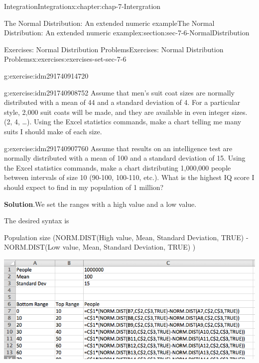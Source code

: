 \documentclass[oneside,10pt,]{book}
\numberwithin{equation}{section}
\begin{document}
\begin{chapterptx}{Integration}{}{Integration}{}{}{x:chapter:chap-7-Intergration}
\begin{sectionptx}{The Normal Distribution: An extended numeric example}{}{The Normal Distribution: An extended numeric example}{}{}{x:section:sec-7-6-NormalDistribution}
\begin{exercises-subsection}{Exercises: Normal Distribution Problems}{}{Exercises: Normal Distribution Problems}{}{}{x:exercises:exercises-set-sec-7-6}
\begin{divisionexercise}{7}{}{}{g:exercise:idm291740914720}
\end{divisionexercise}%
\begin{divisionexercise}{8}{}{}{g:exercise:idm291740908752}%
Assume that men’s suit coat sizes are normally distributed with a mean of 44 and a standard deviation of 4.  For a particular style, 2,000 suit coats will be made, and they are available in even integer sizes.  (2, 4, …). Using the Excel statistics commands, make a chart telling me many suits I should make of each size.%
\end{divisionexercise}%
\begin{divisionexercise}{9}{}{}{g:exercise:idm291740907760}%
Assume that results on an intelligence test are normally distributed with a mean of 100 and a standard deviation of 15.  Using the Excel statistics commands, make a chart distributing 1,000,000 people between intervals of size 10 (90-100, 100-110, etc.).  What is the highest IQ score I should expect to find in my population of 1 million?%
\par\smallskip%
\noindent\textbf{Solution}.\hypertarget{g:solution:idm291740906896}{}\quad{}We set the ranges with a high value and a low value.%
\par
The desired syntax is%
\par
Population size \textasteriskcentered{} (NORM.DIST(High value, Mean, Standard Deviation, TRUE) - NORM.DIST(Low value, Mean, Standard Deviation, TRUE) )%
\begin{sidebyside}{1}{0.1}{0.1}{0}%
\begin{sbspanel}{0.8}%
\includegraphics[width=\linewidth]{images/sec7-6-sol9a.png}
\end{sbspanel}%
\end{sidebyside}%
\begin{sidebyside}{1}{0.3}{0.3}{0}%
\begin{sbspanel}{0.4}%

\end{sbspanel}
\end{sidebyside}
\end{divisionexercise}
\end{exercises-subsection}
\end{sectionptx}
\end{chapterptx}
\end{document}

